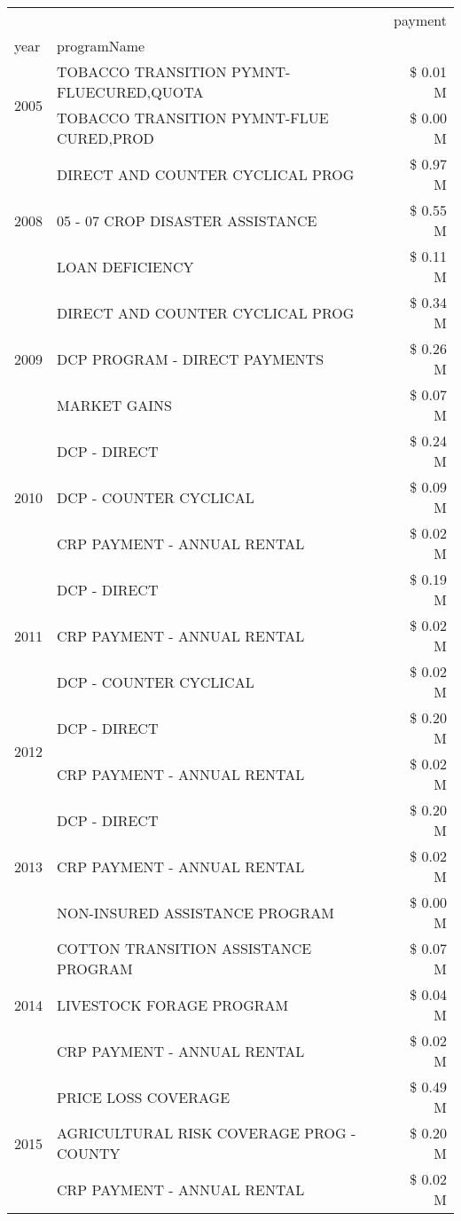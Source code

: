 \begin{tabular}{llr}
\toprule
 &  & payment \\
year & programName &  \\
\midrule
\multirow[t]{2}{*}{2005} & TOBACCO TRANSITION PYMNT-FLUECURED,QUOTA & \$ 0.01 M \\
 & TOBACCO TRANSITION PYMNT-FLUE CURED,PROD & \$ 0.00 M \\
\cline{1-3}
\multirow[t]{3}{*}{2008} & DIRECT AND COUNTER CYCLICAL PROG & \$ 0.97 M \\
 & 05 - 07 CROP DISASTER ASSISTANCE & \$ 0.55 M \\
 & LOAN DEFICIENCY & \$ 0.11 M \\
\cline{1-3}
\multirow[t]{3}{*}{2009} & DIRECT AND COUNTER CYCLICAL PROG & \$ 0.34 M \\
 & DCP PROGRAM - DIRECT PAYMENTS & \$ 0.26 M \\
 & MARKET GAINS & \$ 0.07 M \\
\cline{1-3}
\multirow[t]{3}{*}{2010} & DCP - DIRECT & \$ 0.24 M \\
 & DCP - COUNTER CYCLICAL & \$ 0.09 M \\
 & CRP PAYMENT - ANNUAL RENTAL & \$ 0.02 M \\
\cline{1-3}
\multirow[t]{3}{*}{2011} & DCP - DIRECT & \$ 0.19 M \\
 & CRP PAYMENT - ANNUAL RENTAL & \$ 0.02 M \\
 & DCP - COUNTER CYCLICAL & \$ 0.02 M \\
\cline{1-3}
\multirow[t]{2}{*}{2012} & DCP - DIRECT & \$ 0.20 M \\
 & CRP PAYMENT - ANNUAL RENTAL & \$ 0.02 M \\
\cline{1-3}
\multirow[t]{3}{*}{2013} & DCP - DIRECT & \$ 0.20 M \\
 & CRP PAYMENT - ANNUAL RENTAL & \$ 0.02 M \\
 & NON-INSURED ASSISTANCE PROGRAM & \$ 0.00 M \\
\cline{1-3}
\multirow[t]{3}{*}{2014} & COTTON TRANSITION ASSISTANCE PROGRAM & \$ 0.07 M \\
 & LIVESTOCK FORAGE PROGRAM & \$ 0.04 M \\
 & CRP PAYMENT - ANNUAL RENTAL & \$ 0.02 M \\
\cline{1-3}
\multirow[t]{3}{*}{2015} & PRICE LOSS COVERAGE & \$ 0.49 M \\
 & AGRICULTURAL RISK COVERAGE PROG - COUNTY & \$ 0.20 M \\
 & CRP PAYMENT - ANNUAL RENTAL & \$ 0.02 M \\

\end{tabular}
